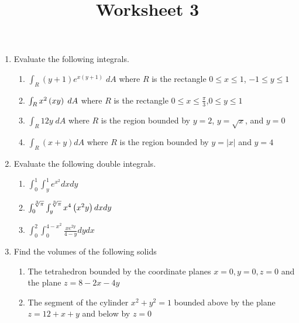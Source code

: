 \documentclass[12pt]{article}
\title{Worksheet 3}
\author{}\date{}
\let\cos\relax\DeclareMathOperator{\cos}{\mathsf{cos}}
\let\sec\relax\DeclareMathOperator{\sec}{\mathsf{sec}}
\begin{document}
\maketitle
\thispagestyle{empty}

\begin{enumerate}
\item Evaluate the following integrals.
\begin{enumerate}
\item $\int_R\left(y+1\right)e^{x\left(y+1\right)}\;dA$
where $R$ is the rectangle $0\le x\le 1$, $-1\le y\le 1$
\vspace{.75cm}
\item $\int_R x\sec^2\left(xy\right)\; dA$ where $R$
is the rectangle $0\le x\le\frac{\pi}{3}$,$0\le y\le 1$
\vspace{.75cm}
\item $\int_R12y\;dA$ where $R$ is the region bounded
by $y=2$, $y=\sqrt{x}$, and $y=0$
\vspace{.75cm}
\item $\int_R\left(x+y\right)dA$ where $R$ is the region
bounded by $y=\left|x\right|$ and $y=4$
\vspace{.75cm}
\end{enumerate}

\item Evaluate the following double integrals.
\begin{enumerate}
\item $\int_0^1\int_y^1e^{x^2}dxdy$
\vspace{.75cm}
\item $\int_0^{\sqrt[3]{\pi}}\int_y^{\sqrt[3]{\pi}}
x^4\cos\left(x^2y\right)dxdy$
\vspace{.75cm}
\item $\int_0^2\int_0^{4-x^2}\frac{xe^{2y}}{4-y}dydx$
\end{enumerate}

\item Find the volumes of the following solids
\begin{enumerate}
\item The tetrahedron bounded by the coordinate planes
$x=0,y=0,z=0$ and the plane $z=8-2x-4y$
\item The segment of the cylinder $x^2+y^2=1$ bounded
above by the plane $z=12+x+y$ and below by $z=0$
\end{enumerate}
\end{enumerate}
\end{document}
